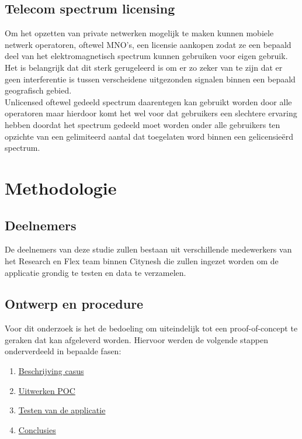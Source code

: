 \subsection{Telecom spectrum licensing}
Om het opzetten van private netwerken mogelijk te maken kunnen mobiele netwerk operatoren, oftewel MNO's, een licensie aankopen zodat ze een bepaald deel van het elektromagnetisch spectrum kunnen gebruiken voor eigen gebruik. Het is belangrijk dat dit sterk gerugeleerd is om er zo zeker van te zijn dat er geen interferentie is tussen verscheidene uitgezonden signalen binnen een bepaald geografisch gebied.\autocite{Trick2022}
\\
Unlicensed oftewel gedeeld spectrum daarentegen kan gebruikt worden door alle operatoren maar hierdoor komt het wel voor dat gebruikers een slechtere ervaring hebben doordat het spectrum gedeeld moet worden onder alle gebruikers ten opzichte van een gelimiteerd aantal dat toegelaten word binnen een gelicensieërd spectrum.\autocite{Trick2022}


\section{Methodologie}%
\label{sec:methodologie}

\subsection{Deelnemers}

De deelnemers van deze studie zullen bestaan uit verschillende medewerkers van het Research en Flex team binnen Citynesh die zullen ingezet worden om de applicatie grondig te testen en data te verzamelen.

\subsection{Ontwerp en procedure}

Voor dit onderzoek is het de bedoeling om uiteindelijk tot een proof-of-concept te geraken dat kan afgeleverd worden. Hiervoor werden de volgende stappen onderverdeeld in bepaalde fasen:

\begin{enumerate}
    \item \hyperref[subsub:beschrijving]{Beschrijving casus}
    \item \hyperref[subsub:uitwerking]{Uitwerken POC}
    \item \hyperref[subsub:testfase]{Testen van de applicatie}
    \item \hyperref[subsub:conclusies]{Conclusies}
\end{enumerate}

